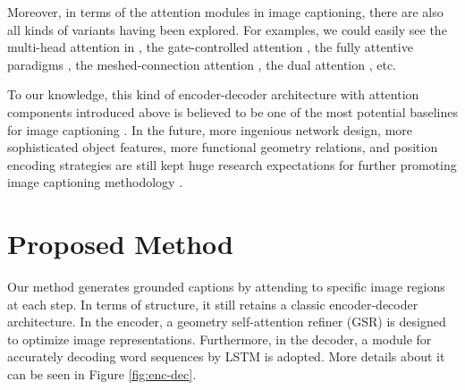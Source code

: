 \documentclass[review]{elsarticle}
\begin{document}
Moreover, in terms of the attention modules in image captioning, there are also all kinds of variants having been explored. For examples, we could easily see the multi-head attention in \cite{vaswani2017attention}, the gate-controlled attention \cite{Oruganti2016}, the fully attentive paradigms \cite{li2019entangled,zhu2018captioning}, the meshed-connection attention \cite{cornia2020meshed}, the dual attention \cite{Yulitao2021}, etc.


To our knowledge, this kind of encoder-decoder architecture with attention components introduced above is believed to be one of the most potential baselines for image captioning \cite{guo2020normalized,herdade2019image}. In the future, more ingenious network design, more sophisticated object features,  more functional geometry relations, and position encoding strategies are still kept huge research expectations for further promoting image captioning methodology \cite{Liushen2021Sibnet}.




\section{Proposed Method}
Our method generates grounded captions by attending to specific image regions at each step. In terms of structure, it still retains a classic encoder-decoder architecture. In the encoder, a geometry self-attention refiner (GSR) is designed to optimize image representations. Furthermore, in the decoder, a module for accurately decoding word sequences by LSTM is adopted. More details about it can be seen in Figure \ref{fig:enc-dec}.
\end{document}
